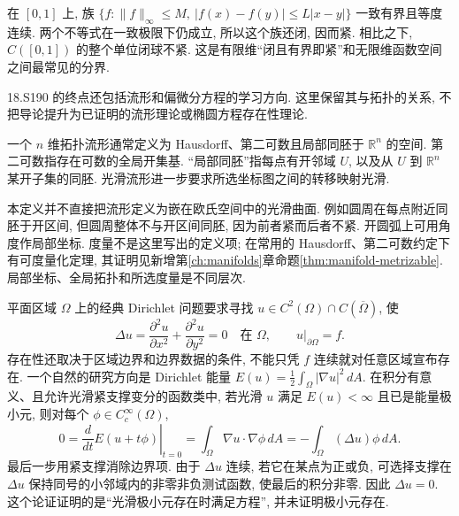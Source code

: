在 $[0,1]$ 上, 族 $\{f:\lVert f\rVert_\infty\le M,\ |f(x)-f(y)|\le L|x-y|\}$ 一致有界且等度连续. 两个不等式在一致极限下仍成立, 所以这个族还闭, 因而紧. 相比之下, $C([0,1])$ 的整个单位闭球不紧. 这是有限维“闭且有界即紧”和无限维函数空间之间最常见的分界.

18.S190 的终点还包括流形和偏微分方程的学习方向. 这里保留其与拓扑的关系, 不把导论提升为已证明的流形理论或椭圆方程存在性理论.

\begin{definition}
一个 $n$ 维拓扑流形通常定义为 Hausdorff、第二可数且局部同胚于 $\mathbb R^n$ 的空间. 第二可数指存在可数的全局开集基. “局部同胚”指每点有开邻域 $U$, 以及从 $U$ 到 $\mathbb R^n$ 某开子集的同胚. 光滑流形进一步要求所选坐标图之间的转移映射光滑.
\end{definition}
本定义并不直接把流形定义为嵌在欧氏空间中的光滑曲面. 例如圆周在每点附近同胚于开区间, 但圆周整体不与开区间同胚, 因为前者紧而后者不紧. 开圆弧上可用角度作局部坐标. 度量不是这里写出的定义项; 在常用的 Hausdorff、第二可数约定下有可度量化定理, 其证明见新增第\ref{ch:manifolds}章命题\ref{thm:manifold-metrizable}. 局部坐标、全局拓扑和所选度量是不同层次.

平面区域 $\Omega$ 上的经典 Dirichlet 问题要求寻找 $u\in C^2(\Omega)\cap C(\overline\Omega)$, 使
\[
 \Delta u=\frac{\partial^2u}{\partial x^2}+\frac{\partial^2u}{\partial y^2}=0\quad\text{在 }\Omega,
 \qquad u|_{\partial\Omega}=f.
\]
存在性还取决于区域边界和边界数据的条件, 不能只凭 $f$ 连续就对任意区域宣布存在. 一个自然的研究方向是 Dirichlet 能量
$E(u)=\frac12\int_\Omega|\nabla u|^2\,dA$. 在积分有意义、且允许光滑紧支撑变分的函数类中, 若光滑 $u$ 满足 $E(u)<\infty$ 且已是能量极小元, 则对每个 $\phi\in C_c^\infty(\Omega)$,
\[
 0=\left.\frac{d}{dt}E(u+t\phi)\right|_{t=0}
   =\int_\Omega\nabla u\cdot\nabla\phi\,dA
   =-\int_\Omega(\Delta u)\phi\,dA.
\]
最后一步用紧支撑消除边界项. 由于 $\Delta u$ 连续, 若它在某点为正或负, 可选择支撑在 $\Delta u$ 保持同号的小邻域内的非零非负测试函数, 使最后的积分非零. 因此 $\Delta u=0$. 这个论证证明的是“光滑极小元存在时满足方程”, 并未证明极小元存在.


